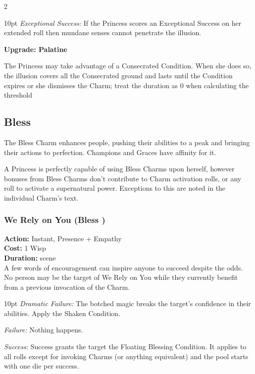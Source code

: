 \begin{multicols}{2}
\begin{myindentpar}{10pt}
\emph{Exceptional Success:} If the Princess scores an Exceptional Success on her extended roll then mundane senses cannot penetrate the illusion. 

\textbf{Upgrade: Palatine} 

The Princess may take advantage of a Consecrated Condition. When she does so, the illusion covers all the Consecrated ground and lasts until the Condition expires or she dismisses the Charm; treat the duration as 0 when calculating the threshold\end{myindentpar}

\subsection*{Bless}
\label{subsec:Bless}
The Bless Charm enhances people, pushing their abilities to a peak and bringing their actions to perfection. Champions and Graces have affinity for it.

A Princess is perfectly capable of using Bless Charms upon herself, however bonuses from Bless Charms don't contribute to Charm activation rolls, or any roll to activate a supernatural power. Exceptions to this are noted in the individual Charm's text. 

\subsubsection*{We Rely on You (Bless \textbullet)}

\noindent \textbf{Action:} Instant, Presence + Empathy\\

\noindent \textbf{Cost:} 1 Wisp\\

\noindent \textbf{Duration:} scene \\

A few words of encouragement can inspire anyone to succeed despite the odds. No person may be the target of We Rely on You while they currently benefit from a previous invocation of the Charm.

\begin{myindentpar}{10pt}  \emph{Dramatic Failure:} The botched magic breaks the target's confidence in their abilities. Apply the Shaken Condition. 

        \emph{Failure:} Nothing happens. 

        \emph{Success:} Success grants the target the Floating Blessing Condition. It applies to all rolls except for invoking Charms (or anything equivalent) and the pool starts with one die per success. 


\end{myindentpar}
\end{multicols}

